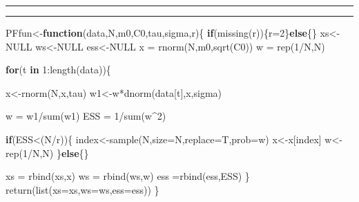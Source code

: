 \documentclass[
]{article}
\newenvironment{Shaded}{\begin{snugshade}}{\end{snugshade}}
\newcommand{\AttributeTok}[1]{\textcolor[rgb]{0.77,0.63,0.00}{#1}}
\newcommand{\ConstantTok}[1]{\textcolor[rgb]{0.00,0.00,0.00}{#1}}
\newcommand{\ControlFlowTok}[1]{\textcolor[rgb]{0.13,0.29,0.53}{\textbf{#1}}}
\newcommand{\DecValTok}[1]{\textcolor[rgb]{0.00,0.00,0.81}{#1}}
\newcommand{\FunctionTok}[1]{\textcolor[rgb]{0.00,0.00,0.00}{#1}}
\newcommand{\NormalTok}[1]{#1}
\newcommand{\OtherTok}[1]{\textcolor[rgb]{0.56,0.35,0.01}{#1}}
\newcommand{\SpecialCharTok}[1]{\textcolor[rgb]{0.00,0.00,0.00}{#1}}
\begin{document}
\hrule
\hrule

\begin{Shaded}
\begin{Highlighting}[]
\NormalTok{PFfun}\OtherTok{\textless{}{-}}\ControlFlowTok{function}\NormalTok{(data,N,m0,C0,tau,sigma,r)\{}
  \ControlFlowTok{if}\NormalTok{(}\FunctionTok{missing}\NormalTok{(r))\{r}\OtherTok{=}\DecValTok{2}\NormalTok{\}}\ControlFlowTok{else}\NormalTok{\{\}}
\NormalTok{  xs}\OtherTok{\textless{}{-}}\ConstantTok{NULL}
\NormalTok{  ws}\OtherTok{\textless{}{-}}\ConstantTok{NULL}
\NormalTok{  ess}\OtherTok{\textless{}{-}}\ConstantTok{NULL}
\NormalTok{  x  }\OtherTok{=} \FunctionTok{rnorm}\NormalTok{(N,m0,}\FunctionTok{sqrt}\NormalTok{(C0))}
\NormalTok{  w  }\OtherTok{=} \FunctionTok{rep}\NormalTok{(}\DecValTok{1}\SpecialCharTok{/}\NormalTok{N,N)}
   
  \ControlFlowTok{for}\NormalTok{(t }\ControlFlowTok{in} \DecValTok{1}\SpecialCharTok{:}\FunctionTok{length}\NormalTok{(data))\{}
    
\NormalTok{    x}\OtherTok{\textless{}{-}}\FunctionTok{rnorm}\NormalTok{(N,x,tau)}
\NormalTok{    w1}\OtherTok{\textless{}{-}}\NormalTok{w}\SpecialCharTok{*}\FunctionTok{dnorm}\NormalTok{(data[t],x,sigma)}
    
\NormalTok{    w }\OtherTok{=}\NormalTok{ w1}\SpecialCharTok{/}\FunctionTok{sum}\NormalTok{(w1)}
\NormalTok{    ESS  }\OtherTok{=} \DecValTok{1}\SpecialCharTok{/}\FunctionTok{sum}\NormalTok{(w}\SpecialCharTok{\^{}}\DecValTok{2}\NormalTok{)}
    
    \ControlFlowTok{if}\NormalTok{(ESS}\SpecialCharTok{\textless{}}\NormalTok{(N}\SpecialCharTok{/}\NormalTok{r))\{}
\NormalTok{      index}\OtherTok{\textless{}{-}}\FunctionTok{sample}\NormalTok{(N,}\AttributeTok{size=}\NormalTok{N,}\AttributeTok{replace=}\NormalTok{T,}\AttributeTok{prob=}\NormalTok{w)}
\NormalTok{      x}\OtherTok{\textless{}{-}}\NormalTok{x[index]}
\NormalTok{      w}\OtherTok{\textless{}{-}}\FunctionTok{rep}\NormalTok{(}\DecValTok{1}\SpecialCharTok{/}\NormalTok{N,N)}
\NormalTok{    \}}\ControlFlowTok{else}\NormalTok{\{\}}
    
\NormalTok{    xs }\OtherTok{=} \FunctionTok{rbind}\NormalTok{(xs,x)}
\NormalTok{    ws }\OtherTok{=} \FunctionTok{rbind}\NormalTok{(ws,w)}
\NormalTok{    ess }\OtherTok{=}\FunctionTok{rbind}\NormalTok{(ess,ESS)}
\NormalTok{  \}}
  \FunctionTok{return}\NormalTok{(}\FunctionTok{list}\NormalTok{(}\AttributeTok{xs=}\NormalTok{xs,}\AttributeTok{ws=}\NormalTok{ws,}\AttributeTok{ess=}\NormalTok{ess))}
\NormalTok{\}}
\end{Highlighting}
\end{Shaded}
\end{document}
